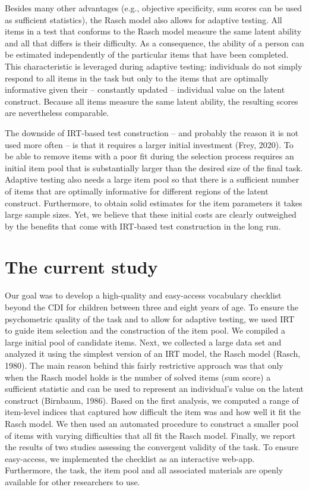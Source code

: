 \documentclass[
  man,floatsintext]{apa6}
\begin{document}
Besides many other advantages (e.g., objective specificity, sum scores can be used as sufficient statistics), the Rasch model also allows for adaptive testing. All items in a test that conforms to the Rasch model measure the same latent ability and all that differs is their difficulty. As a consequence, the ability of a person can be estimated independently of the particular items that have been completed. This characteristic is leveraged during adaptive testing: individuals do not simply respond to all items in the task but only to the items that are optimally informative given their -- constantly updated -- individual value on the latent construct. Because all items measure the same latent ability, the resulting scores are nevertheless comparable.

The downside of IRT-based test construction -- and probably the reason it is not used more often -- is that it requires a larger initial investment (Frey, 2020). To be able to remove items with a poor fit during the selection process requires an initial item pool that is substantially larger than the desired size of the final task. Adaptive testing also needs a large item pool so that there is a sufficient number of items that are optimally informative for different regions of the latent construct. Furthermore, to obtain solid estimates for the item parameters it takes large sample sizes. Yet, we believe that these initial costs are clearly outweighed by the benefits that come with IRT-based test construction in the long run.

\hypertarget{the-current-study}{%
\section{The current study}\label{the-current-study}}

Our goal was to develop a high-quality and easy-access vocabulary checklist beyond the CDI for children between three and eight years of age. To ensure the psychometric quality of the task and to allow for adaptive testing, we used IRT to guide item selection and the construction of the item pool. We compiled a large initial pool of candidate items. Next, we collected a large data set and analyzed it using the simplest version of an IRT model, the Rasch model (Rasch, 1980). The main reason behind this fairly restrictive approach was that only when the Rasch model holds is the number of solved items (sum score) a sufficient statistic and can be used to represent an individual's value on the latent construct (Birnbaum, 1986). Based on the first analysis, we computed a range of item-level indices that captured how difficult the item was and how well it fit the Rasch model. We then used an automated procedure to construct a smaller pool of items with varying difficulties that all fit the Rasch model. Finally, we report the results of two studies assessing the convergent validity of the task. To ensure easy-access, we implemented the checklist as an interactive web-app. Furthermore, the task, the item pool and all associated materials are openly available for other researchers to use.
\end{document}
